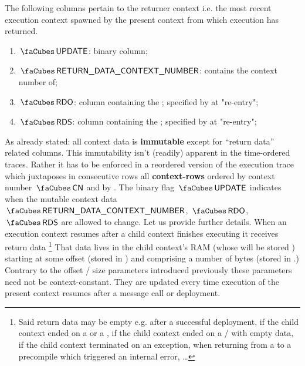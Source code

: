 The following columns pertain to the returner context i.e. the most recent execution context spawned by the present context from which execution has returned. 
\begin{enumerate}[resume]
	\item $\cnUpdate$:
		binary column;
	\item $\cnReturner$:
		contains the context number of;
	\item $\cnRdo$:
		column containing the \RDO{}; specified by \cnReturner{} at "re-entry";
	\item $\cnRds$:
		column containing the \RDS{}; specified by \cnReturner{} at "re-entry";
\end{enumerate}
As already stated: all context data is \textbf{immutable} except for ``return data'' related columns. This immutability isn't (readily) apparent in the time-ordered traces. Rather it has to be enforced in a reordered version of the execution trace which juxtaposes in consecutive rows all \textbf{context-rows} ordered by context number $\cnCn$ and by \hubStamp{}.
The binary flag $\cnUpdate$ indicates when the mutable context data $\cnReturner$, $\cnRdo$, $\cnRds$ are allowed to change.
Let us provide further details.
When an execution context resumes after a child context finishes executing it receives return data%
\footnote{Said return data may be empty e.g. after a successful deployment, if the child context ended on a  or a , if the child context ended on a / with empty data, if the child context terminated on an exception, when returning from a  to a precompile which triggered an internal error, \dots} That data lives in the child context's RAM (whose \cn{} will be stored \cnReturner{}) starting at some offset (stored in \cnRdo{}) and comprising a number of bytes (stored in \cnRds{}.) Contrary to the offset / size parameters introduced previously these parameters need not be context-constant. They are updated every time execution of the present context resumes after a message call or deployment.

